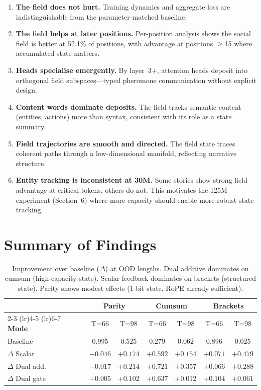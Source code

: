 \documentclass[11pt,a4paper]{article}
\begin{document}
\begin{enumerate}
    \item \textbf{The field does not hurt.}  Training dynamics and
          aggregate loss are indistinguishable from the parameter-matched
          baseline.
    \item \textbf{The field helps at later positions.}  Per-position
          analysis shows the social field is better at 52.1\% of
          positions, with advantage at positions $\geq$15 where
          accumulated state matters.
    \item \textbf{Heads specialise emergently.}  By layer~3+, attention
          heads deposit into orthogonal field subspaces---typed
          pheromone communication without explicit design.
    \item \textbf{Content words dominate deposits.}  The field tracks
          semantic content (entities, actions) more than syntax,
          consistent with its role as a state summary.
    \item \textbf{Field trajectories are smooth and directed.}  The
          field state traces coherent paths through a low-dimensional
          manifold, reflecting narrative structure.
    \item \textbf{Entity tracking is inconsistent at 30M.}  Some
          stories show strong field advantage at critical tokens, others
          do not.  This motivates the 125M experiment (Section~6) where
          more capacity should enable more robust state tracking.
\end{enumerate}


\section{Summary of Findings}

\begin{table}[h]
\centering
\small
\begin{tabular}{@{}lcccccc@{}}
\toprule
& \multicolumn{2}{c}{\textbf{Parity}} &
\multicolumn{2}{c}{\textbf{Cumsum}} &
\multicolumn{2}{c}{\textbf{Brackets}} \\
\cmidrule(lr){2-3} \cmidrule(lr){4-5} \cmidrule(lr){6-7}
\textbf{Mode} & T=66 & T=98 & T=66 & T=98 & T=66 & T=98 \\
\midrule
Baseline & 0.995 & 0.525 & 0.279 & 0.062 & 0.896 & 0.025 \\
$\Delta$ Scalar & $-0.046$ & $+0.174$ & $+0.592$ & $+0.154$
& $+0.071$ & $\mathbf{+0.479}$ \\
$\Delta$ Dual add. & $-0.017$ & $+0.214$ & $\mathbf{+0.721}$
& $\mathbf{+0.357}$ & $+0.066$ & $+0.288$ \\
$\Delta$ Dual gate & $+0.005$ & $+0.102$ & $+0.637$ & $+0.012$
& $+0.104$ & $+0.061$ \\
\bottomrule
\end{tabular}
\caption{Improvement over baseline ($\Delta$) at OOD lengths.
Dual additive dominates on cumsum (high-capacity state).
Scalar feedback dominates on brackets (structured state).
Parity shows modest effects (1-bit state, RoPE already sufficient).}
\label{tab:summary}
\end{table}
\end{document}
